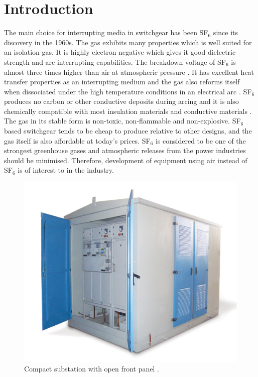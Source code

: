 \documentclass[10pt,a4paper,twoside]{article}
\begin{document}
\cleardoublepage
\setcounter{page}{1}
\tableofcontents
\cleardoublepage

\section{Introduction}
The main choice for interrupting media in switchgear has been SF$_6$ since its discovery in the 1960s. The gas exhibits many properties which is well suited for an isolation gas. It is highly electron negative which gives it good dielectric strength and arc-interrupting capabilities. The breakdown voltage of SF$_6$ is almost three times higher than air at atmospheric pressure \cite{bib:SF6PI}. It has excellent heat transfer properties as an interrupting medium and the gas also reforms itself when dissociated under the high temperature conditions in an electrical arc  \cite{bib:SF6PI}. SF$_6$ produces no carbon or other conductive deposits during arcing and it is also chemically compatible with most insulation materials and conductive materials \cite{bib:SF6PI}. The gas in its stable form is non-toxic, non-flammable and non-explosive. SF$_6$ based switchgear tends to be cheap to produce relative to other designs, and the gas itself is also affordable at today's prices. SF$_6$ is considered to be one of the strongest greenhouse gases and atmospheric releases from the power industries should be minimised. Therefore, development of equipment using air instead of SF$_6$ is of interest to in the industry.

\begin{figure} [h]
\centering
\includegraphics[scale=0.5]{Bilder/Introduction/general_substation.jpg}
\caption{Compact substation with open front panel \cite{bib:comSub}.} \label{fig:compact substation}
\end{figure}
\end{document}
